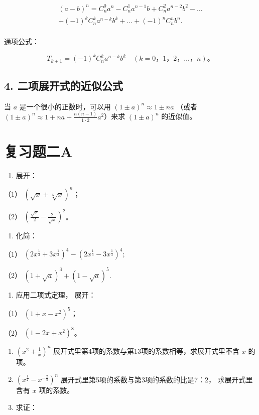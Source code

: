 \[
\begin{array}{l} (a - b) ^ {n} = C _ {n} ^ {0} a ^ {n} - C _ {n} ^ {1} a ^ {n - 1} b + C _ {n} ^ {2} a ^ {n - 2} b ^ {2} - \dots \\ + (- 1) ^ {k} C _ {n} ^ {k} a ^ {n - k} b ^ {k} + \dots + (- 1) ^ {n} C _ {n} ^ {n} b ^ {n}. \\ \end{array}
\]

通项公式：

\[
T _ {k + 1} = (- 1) ^ {k} C _ {n} ^ {k} a ^ {n - k} b ^ {k} \quad (k = 0\text{，} 1\text{，} 2\text{，} \dots \text{，} n)\text{。}
\]

\subsection{4. 二项展开式的近似公式}

当 \(a\) 是一个很小的正数时，可以用 \((1 \pm a)^n \approx 1 \pm n a\)
（或者
\((1 \pm a)^n \approx 1 + na + \frac{n(n - 1)}{1 \cdot 2} a^2\)）来求
\((1 \pm a)^n\) 的近似值。

\section{复习题二A}

\begin{enumerate}
\item
  展开：
\end{enumerate}

（1） \((\sqrt{x} + \sqrt[5]{x})^n\)；

（2） \(\left(\frac{\sqrt{x}}{2} - \frac{2}{\sqrt{x}}\right)^2\)。

\begin{enumerate}[start=2]
\item
  化简：
\end{enumerate}

（1）
\((2x^{\frac{1}{3}} + 3x^{\frac{1}{3}})^{4} - (2x^{\frac{1}{3}} - 3x^{\frac{1}{3}})^{4};\)

（2） \((1 + \sqrt{a})^3 + (1 - \sqrt{a})^5.\)

\begin{enumerate}[start=5]
\item
  应用二项式定理， 展开：
\end{enumerate}

（1） \((1 + x - x^2)^5\)；

（2） \((1 - 2x + x^2)^8\)。

\begin{enumerate}[start=4]
\item
  \(\left(x^{2} + \frac{1}{x}\right)^{n}\)
  展开式里第4项的系数与第13项的系数相等，求展开式里不含 \(x\) 的项。
\item
  \((x^{\frac{1}{2}} - x^{-\frac{2}{5}})^n\)
  展开式里第5项的系数与第3项的系数的比是7：2， 求展开式里含有 \(x\)
  项的系数。
\item
  求证：
\end{enumerate}

